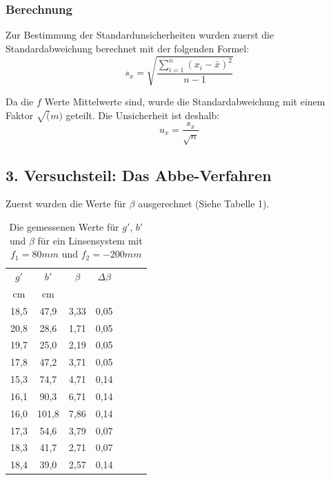 \documentclass[11pt,a4paper]{article}
\begin{document}
\begin{tcolorbox}[colback=white]
	\subsubsection{Berechnung}
	Zur Bestimmung der Standardunsicherheiten wurden zuerst die Standardabweichung berechnet mit der folgenden Formel:
	$$s_x = \sqrt{\frac{\sum_{i=1}^{n}(x_i-\bar{x})^2}{n-1}} $$
	
	Da die $f$ Werte Mittelwerte sind, wurde die Standardabweichung mit einem Faktor $\sqrt(m)$ geteilt. Die Unsicherheit ist deshalb:
	$$u_x = \frac{s_x}{\sqrt{n}}$$
\end{tcolorbox}

\subsection{3. Versuchsteil: Das Abbe-Verfahren}
Zuerst wurden die Werte für $\beta$ ausgerechnet (Siehe Tabelle 1).



\begin{table}[h]
	\centering
	\begin{tabular*}{0.50\textwidth}{@{\extracolsep{\fill}}cc|ccccc}
		\toprule
		$g'$ & $b'$ & $\beta$ & $\Delta \beta$   \\
		cm & cm& &\\
		18,5&47,9&3,33&0,05\\
		20,8&28,6&1,71&0,05\\
		19,7&25,0&2,19&0,05\\
		17,8&47,2&3,71&0,05\\
		15,3&74,7&4,71&0,14\\
		16,1&90,3&6,71&0,14\\
		16,0&101,8&7,86&0,14\\
		17,3&54,6&3,79&0,07\\
		18,3&41,7&2,71&0,07\\
		18,4&39,0&2,57&0,14\\
		\bottomrule
	\end{tabular*}
	\caption{Die gemessenen Werte für $g'$, $b'$ und $\beta$ für ein Linsensystem mit $f_1 = 80mm$ und $f_2 = -200mm$}
\end{table}
\end{document}
